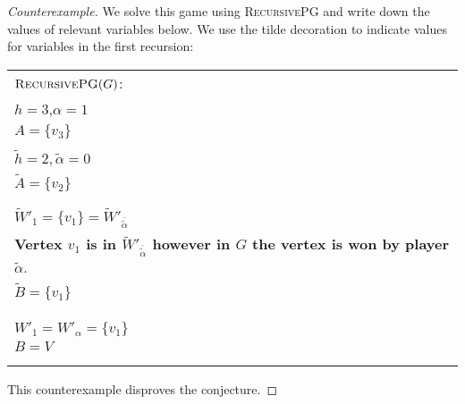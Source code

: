 \begin{conjecture}[Disproven]
\begin{proof}[Counterexample]
		We solve this game using \textsc{RecursivePG} and write down the values of relevant variables below. We use the tilde decoration to indicate values for variables in the first recursion:
		\begin{longtable}{|p{20cm}}
			$\textsc{RecursivePG}(G)$:\\
			$h=3$,$\alpha=1$\\
			$A =\{v_3\}$\\
			\begin{tabular}{|p{20cm}}
				$\textsc{RecursivePG}(G\backslash A)$:\\
				$\tilde{h}=2,\tilde{\alpha}=0$\\
				$\tilde{A}=\{v_2\}$\\
				\begin{tabular}{|p{20cm}}
					$\textsc{RecursivePG}(G\backslash A\backslash \tilde{A})$\\
				\end{tabular}
				$\tilde{W}'_0 = \emptyset$\\
				$\tilde{W}'_1 = \{v_1\} = \tilde{W}'_{\overline{\tilde{\alpha}}}$\\
				\textbf{Vertex $v_1$ is in $\tilde{W}'_{\overline{\tilde{\alpha}}}$ however in $G$ the vertex is won by player} $\tilde{\alpha}$.\\
				$\tilde{B} = \{v_1\}$\\
				\begin{tabular}{|p{20cm}}
					$\textsc{RecursivePG}(G\backslash A\backslash \tilde{B})$\\
				\end{tabular}
				$\tilde{W}''_0 = \{v_2\}, \tilde{W}''_1 = \emptyset$\\
			\end{tabular}
			$W'_0 = W'_{\overline{\alpha}} = \{v_2\}$\\
			$W'_1 = W'_\alpha = \{v_1\}$\\
			$B = V$\\
			\begin{tabular}{|p{20cm}}
				$\textsc{RecursivePG}(G\backslash B)$\\
			\end{tabular}
			$W_0 = W_{\overline{\alpha}} = V$
		\end{longtable}
		
		This counterexample disproves the conjecture.
\end{proof}\end{conjecture}

